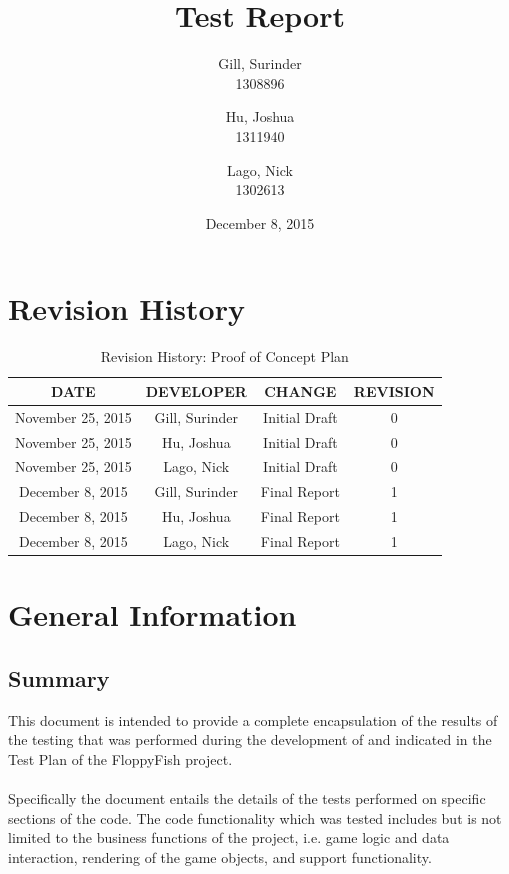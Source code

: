 \documentclass[11pt, oneside]{article}   	%
\title{Test Report}
\author{Gill, Surinder\\
		1308896
		\and
		Hu, Joshua\\
		1311940
		\and
		Lago, Nick\\
		1302613}
\date{December 8, 2015}							%
\begin{document}
\maketitle
\newpage
\tableofcontents
\listoffigures
\listoftables

\newpage
\section{Revision History}
\begin{table}[H]
\caption{Revision History: Proof of Concept Plan}
\begin{center}
\label{tab:}
\begin{tabular}{|c|c|c|c|}
\hline
\textbf{DATE} & \textbf{DEVELOPER} & \textbf{CHANGE} & \textbf{REVISION}\\
\hline
November 25, 2015 & Gill, Surinder & Initial Draft & 0\\
\hline
November 25, 2015 & Hu, Joshua & Initial Draft & 0\\
\hline
November 25, 2015 & Lago, Nick & Initial Draft & 0\\
\hline
December 8, 2015 & Gill, Surinder & Final Report & 1\\
\hline
December 8, 2015 & Hu, Joshua & Final Report & 1\\
\hline
December 8, 2015 & Lago, Nick & Final Report & 1\\
\hline
\end{tabular}
\end{center}
\label{default}
\end{table}

\newpage
\section{General Information}
\subsection{Summary}
This document is intended to provide a complete encapsulation of the results of the testing that was performed during the development of and indicated in the Test Plan of the FloppyFish project.\\
\\
Specifically the document entails the details of the tests performed on specific sections of the code. The code functionality which was tested includes but is not limited to the business functions of the project, i.e. game logic and data interaction, rendering of the game objects, and support functionality.
\end{document}
